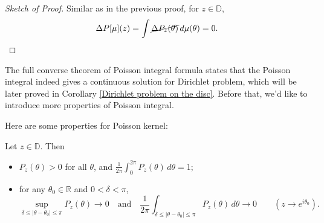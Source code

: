 \begin{proof}[Sketch of Proof]
Similar as in the previous proof, for $z\in\mathbb{D}$,
\begin{equation*}
  \Delta P[\mu](z)=\int \cancel{\Delta P_z(\theta)}\, d\mu(\theta)=0.
\end{equation*}
\end{proof}
The full converse theorem of Poisson integral formula states that the Poisson integral indeed
gives a continuous solution for Dirichlet problem, which will be later proved in Corollary 
\ref{Dirichlet problem on the disc}. Before that, we'd like to introduce more properties of 
Poisson integral.



Here are some properties for Poisson kernel:
\begin{lemma}\label{Properties of Poisson kernel}
Let $z\in\mathbb{D}$. Then
\begin{itemize}
  \item[(a)] $P_z(\theta)>0$ for all $\theta$, and
  $\displaystyle\frac{1}{2\pi}\int_0^{2\pi} P_z(\theta)\, d\theta=1$;
  \item[(b)] for any $\theta_0\in\mathbb{R}$ and $0<\delta<\pi$,
  \begin{equation*}
    \sup_{\delta\leq|\theta-\theta_0|\leq\pi}P_z(\theta)\rightarrow 0
    \quad\text{and}\quad
    \frac{1}{2\pi}\int_{\delta\leq|\theta-\theta_0|\leq\pi}P_z(\theta)\, d\theta\rightarrow 0
    \qquad (z\rightarrow e^{i\theta_0}).
  \end{equation*}
\end{itemize}
\end{lemma}

